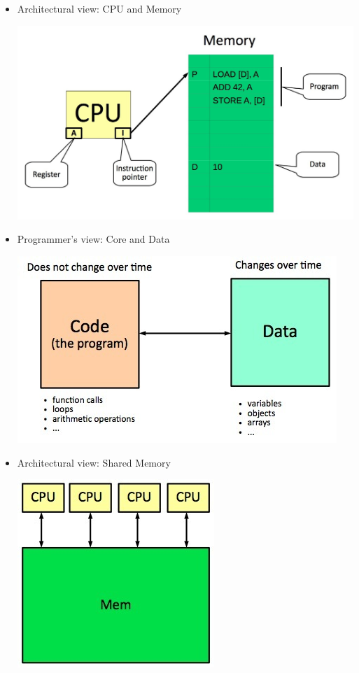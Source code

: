 \documentclass[a4paper]{article}
\begin{document}
\begin{itemize}
\item Architectural view: CPU and Memory
\begin{center}
\includegraphics[scale=0.2]{Figures/architecturalViewCpuAndMemory.jpg}
\end{center}

\item Programmer's view: Core and Data
\begin{center}
\includegraphics[scale=0.6]{Figures/programmersViewCoreAndData.jpg}
\end{center}

\item Architectural view: Shared Memory
\begin{center}
\includegraphics[scale=0.5]{Figures/architecturalViewSharedMemory.jpg}
\end{center}


\end{itemize}
\end{document}
